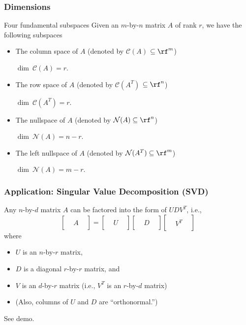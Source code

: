 \begin{frame}
  \frametitle{Dimensions}

  \begin{block}{Four fundamental subspaces}
    Given an $m$-by-$n$ matrix $A$ of rank $r$, we have the following
    subspaces
    \begin{itemize}
    \item The column space of $A$ (denoted by ${\mathcal C}(A)$
      {$\subseteq \rf^m$})

      $\dim~{\mathcal C}(A) = r$.
    \item The row space of $A$ (denoted by ${\mathcal C}(A^T)$
      {$\subseteq \rf^n$})

      $\dim~{\mathcal C}(A^T) = r$.
    \item The nullspace of $A$ (denoted by ${\mathcal N}(A) \subseteq \rf^n$)

      $\dim~{\mathcal N}(A) = n-r$.
    \item The left nullspace of $A$ (denoted by ${\mathcal N}(A^T) \subseteq \rf^m$)

      $\dim~{\mathcal N}(A) = m-r$.
    \end{itemize}
  \end{block}
\end{frame}

\begin{frame}
  \frametitle{Application: Singular Value Decomposition (SVD)}

  Any $n$-by-$d$ matrix $A$ can be factored into the form of $UDV^T$, i.e.,
  \[
  \begin{bmatrix}
    & & \\
    & A & \\
    & &
  \end{bmatrix} =
  \begin{bmatrix}
    & & \\
    & U & \\
    & &
  \end{bmatrix} 
  \begin{bmatrix}
    & & \\
    & D & \\
    & &
  \end{bmatrix} 
  \begin{bmatrix}
    & & \\
    & V^T & \\
    & &
  \end{bmatrix} 
  \]
  where
  \begin{itemize}
  \item $U$ is an $n$-by-$r$ matrix,
  \item $D$ is a diagonal $r$-by-$r$ matrix, and
  \item $V$ is an $d$-by-$r$ matrix (i.e., $V^T$ is an $r$-by-$d$ matrix)
  \item (Also, columns of $U$ and $D$ are ``orthonormal.'')
  \end{itemize}

  \vspace{0.5in}
  See demo.
\end{frame}

